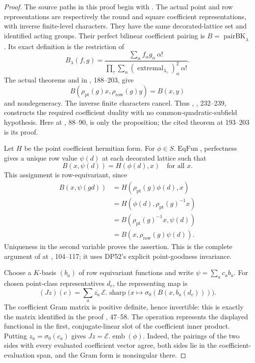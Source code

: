 \documentclass[11pt,a4paper]{article}
\theoremstyle{definition}\newtheorem{remark}[theorem]{Remark}
\begin{document}
\begin{proof}
The source paths in this proof begin with
.
The actual point and row representations are respectively the round
and square coefficient representations, with inverse finite-level
characters. They have the same decorated-lattice set and identified
acting groups.
Their perfect bilinear coefficient pairing is
$B=\operatorname{pairBK}_\lambda$.
Its exact definition is the restriction of
\[
 B_\lambda(f,g)=
 \frac{\sum_\alpha f_\alpha g_\alpha\,\alpha!}
 {\prod_\tau\sum_\alpha
       (\operatorname{extremal}_{\lambda_\tau})_\alpha^2\,\alpha!}.
\]
The actual theorems  and
 in ,
188--203, give
\[
 B(\rho_{\mathrm{pt}}(g)x,\rho_{\mathrm{row}}(g)y)=B(x,y)
\]
and nondegeneracy. The inverse finite characters cancel.
Thus , , 232--239, constructs the
required coefficient duality with no common-quadratic-subfield hypothesis.
Here  at , 88--90, is only the
proposition; the cited theorem at 193--203 is its proof.

Let $H$ be the point coefficient hermitian form.
For $\phi\in S.\operatorname{EqFun}$, perfectness gives a unique
row value $\psi(d)$ at each decorated lattice such that
\[
 B(x,\psi(d))=H(\phi(d),x)\quad\text{for all }x.
\]
This assignment is row-equivariant, since
\[
 \begin{aligned}
 B(x,\psi(gd))
 &=H(\rho_{\mathrm{pt}}(g)\phi(d),x)\\
 &=H(\phi(d),\rho_{\mathrm{pt}}(g)^{-1}x)\\
 &=B(\rho_{\mathrm{pt}}(g)^{-1}x,\psi(d))\\
 &=B(x,\rho_{\mathrm{row}}(g)\psi(d)).
 \end{aligned}
\]
Uniqueness in the second variable proves the assertion.
This is the complete argument of  at
, 104--117; it uses DP52's explicit point-goodness
invariance.

Choose a $K$-basis $(b_a)$ of row equivariant functions and write
$\psi=\sum_a c_ab_a$.
For chosen point-class representatives $d_c$, the representing map is
\[
 (Jz)(c)=\sum_a\overline{z_a}\,
  \mathcal E.\operatorname{sharp}
  \bigl(x\longmapsto\sigma_0(B(x,b_a(d_c)))\bigr).
\]
The coefficient Gram matrix is positive definite, hence invertible:
this is exactly the matrix identified in the proof
, 47--58.
The operation  represents the displayed functional in the
first, conjugate-linear slot of the coefficient inner product.
Putting $z_a=\sigma_0(c_a)$ gives
$Jz=\mathcal E.\operatorname{emb}(\phi)$.
Indeed, the pairings of the two sides with every evaluated coefficient
vector agree, both sides lie in the coefficient-evaluation span, and
the Gram form is nonsingular there.


\end{proof}
\end{document}
